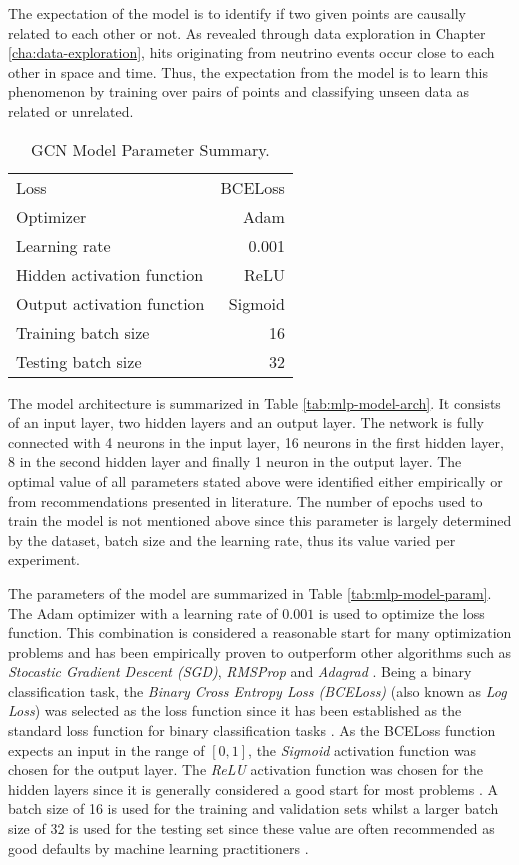 The expectation of the model is to identify if two given points are
causally related to each other or not. As revealed through data
exploration in Chapter \ref{cha:data-exploration}, hits originating
from neutrino events occur close to each other in space and time.
Thus, the expectation from the model is to learn this phenomenon by
training over pairs of points and classifying unseen data as related
or unrelated.

\begin{table}[htb]
  \centering
  \caption{GCN Model Parameter Summary.}
  \begin{tabular}{lr}
    \hline
    Loss & BCELoss \\
    Optimizer & Adam \\
    Learning rate & 0.001 \\
    Hidden activation function & ReLU\\
    Output activation function & Sigmoid \\
    Training batch size & 16 \\
    Testing batch size & 32 \\
    \hline
  \end{tabular}
  \label{tab:gcn-model-param}
\end{table}

The model architecture is summarized in Table
\ref{tab:mlp-model-arch}. It consists of an input layer, two hidden
layers and an output layer. The network is fully connected with 4
neurons in the input layer, 16 neurons in the first hidden layer, 8 in
the second hidden layer and finally 1 neuron in the output layer. The
optimal value of all parameters stated above were identified either
empirically or from recommendations presented in literature. The
number of epochs used to train the model is not mentioned above since
this parameter is largely determined by the dataset, batch size and
the learning rate, thus its value varied per experiment.

The parameters of the model are summarized in Table
\ref{tab:mlp-model-param}. The Adam optimizer with a learning rate of
$0.001$ is used to optimize the loss function. This combination is
considered a reasonable start for many optimization problems and has
been empirically proven to outperform other algorithms such as
\textit{Stocastic Gradient Descent (SGD)}, \textit{RMSProp} and
\textit{Adagrad} \cite{ruder2016overview}. Being a binary
classification task, the \textit{Binary Cross Entropy Loss (BCELoss)}
(also known as \textit{Log Loss}) was selected as the loss function
since it has been established as the standard loss function for binary
classification tasks \cite{painsky2018universality}. As the BCELoss
function expects an input in the range of $[0, 1]$, the
\textit{Sigmoid} activation function was chosen for the output layer.
The \textit{ReLU} activation function was chosen for the hidden layers
since it is generally considered a good start for most problems
\cite{nwankpa2018activation, wang2019learning}. A batch size of 16 is
used for the training and validation sets whilst a larger batch size
of 32 is used for the testing set since these value are often
recommended as good defaults by machine learning practitioners
\cite{bengio2012practical,Goodfellow-et-al-2016}.

